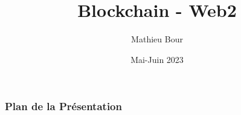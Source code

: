 \documentclass[xcolor=x11names,aspectratio=169,french,handout]{beamer}
\title[Blockchain]{Blockchain - Web2}
\institute[]{Mewo Informatique}
\author{Mathieu Bour}
\date{Mai-Juin 2023}
\begin{document}
\begin{frame}
  \maketitle
\end{frame}

\setlength{\parskip}{0.7em}



\begin{frame}
  \frametitle{Plan de la Présentation}
  \setcounter{tocdepth}{1}
  \tableofcontents
\end{frame}




\end{document}
